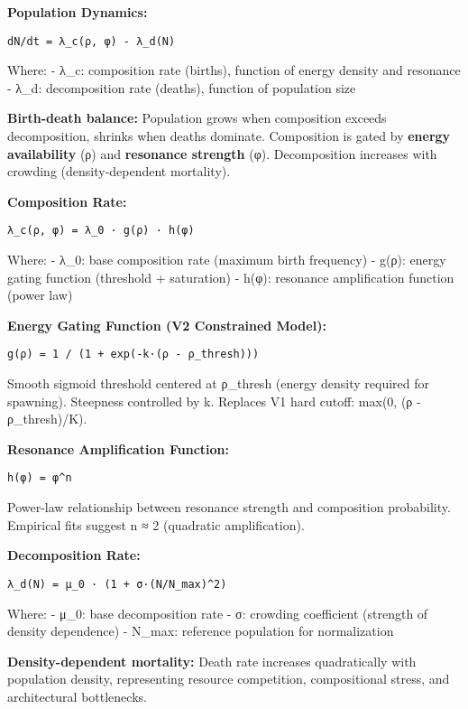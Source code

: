 \documentclass[
]{article}
\begin{document}
\textbf{Population Dynamics:}

\begin{verbatim}
dN/dt = λ_c(ρ, φ) - λ_d(N)
\end{verbatim}

Where: - λ\_c: composition rate (births), function of energy density and
resonance - λ\_d: decomposition rate (deaths), function of population
size

\textbf{Birth-death balance:} Population grows when composition exceeds
decomposition, shrinks when deaths dominate. Composition is gated by
\textbf{energy availability} (ρ) and \textbf{resonance strength} (φ).
Decomposition increases with crowding (density-dependent mortality).

\textbf{Composition Rate:}

\begin{verbatim}
λ_c(ρ, φ) = λ_0 · g(ρ) · h(φ)
\end{verbatim}

Where: - λ\_0: base composition rate (maximum birth frequency) - g(ρ):
energy gating function (threshold + saturation) - h(φ): resonance
amplification function (power law)

\textbf{Energy Gating Function (V2 Constrained Model):}

\begin{verbatim}
g(ρ) = 1 / (1 + exp(-k·(ρ - ρ_thresh)))
\end{verbatim}

Smooth sigmoid threshold centered at ρ\_thresh (energy density required
for spawning). Steepness controlled by k. Replaces V1 hard cutoff:
max(0, (ρ - ρ\_thresh)/K).

\textbf{Resonance Amplification Function:}

\begin{verbatim}
h(φ) = φ^n
\end{verbatim}

Power-law relationship between resonance strength and composition
probability. Empirical fits suggest n ≈ 2 (quadratic amplification).

\textbf{Decomposition Rate:}

\begin{verbatim}
λ_d(N) = μ_0 · (1 + σ·(N/N_max)^2)
\end{verbatim}

Where: - μ\_0: base decomposition rate - σ: crowding coefficient
(strength of density dependence) - N\_max: reference population for
normalization

\textbf{Density-dependent mortality:} Death rate increases quadratically
with population density, representing resource competition,
compositional stress, and architectural bottlenecks.
\end{document}
